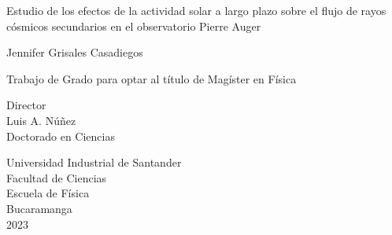 
\begin{center}

Estudio de los efectos de la actividad solar a largo plazo sobre el flujo de rayos cósmicos secundarios en el observatorio Pierre Auger \vspace{1.5cm}

Jennifer Grisales Casadiegos\\ \vspace{1.5cm}

Trabajo de Grado para optar al título de Magíster en Física\\ \vspace{0.5cm}

Director\\
Luis A. Núñez\\
Doctorado en Ciencias\\ \vspace{4cm}

Universidad Industrial de Santander\\
Facultad de Ciencias\\
Escuela de Física\\
Bucaramanga\\
2023\\

\end{center}

